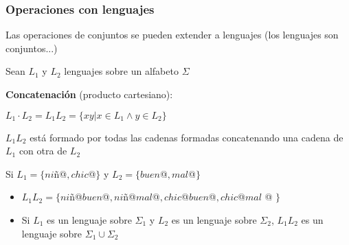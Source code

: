 \begin{frame}
  \frametitle{Operaciones con lenguajes}
				Las operaciones de conjuntos se pueden extender a lenguajes (los lenguajes son conjuntos...)

        \pause
			  Sean $L_1$ y $L_2$ lenguajes sobre un alfabeto $\Sigma$
      \pause

      \begin{defi}
			\textbf{Concatenación} (producto cartesiano): 
			
			$L_1 \cdot L_2 = L_1 L_2 = \{xy | x \in L_1 \wedge y \in L_2\}$

			$L_1 L_2$ está formado por todas las cadenas formadas concatenando una cadena de $L_1$ con otra de $L_2$
			\end{defi}

      \pause
      \begin{block}{Si $L_1 = \{ ni$ñ@$, chic$@$ \}$ y  $L_2 = \{ buen$@$, mal$@$ \}$}
           \begin{itemize}[<+->]
           \item $L_1 L_2 = \{ ni$ñ@$buen$@$, ni$ñ@$mal$@$, chic$@$buen$@$, chic$@$mal$ @ $ \}$
           \item Si $L_1$ es un lenguaje sobre $\Sigma_1$ y $L_2$ es un lenguaje sobre $\Sigma_2$, $L_1 L_2$ es un lenguaje
					       sobre $\Sigma_1 \cup \Sigma_2$
           \end{itemize}
			\end{block}
\end{frame}
